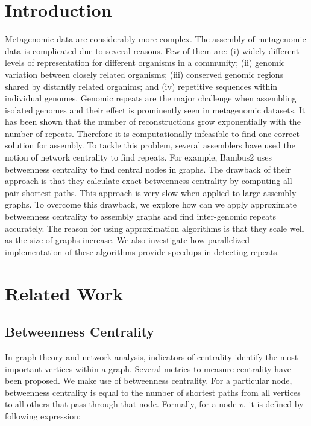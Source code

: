 \documentclass[runningheads,a4paper]{llncs}
\begin{document}
\section{Introduction}

Metagenomic data are considerably more complex. The assembly of metagenomic data is complicated due to several reasons. Few of them are: (i) widely different levels of representation for different organisms in a community; (ii) genomic variation between closely related organisms; (iii) conserved genomic regions shared by distantly related organims; and (iv) repetitive sequences within individual genomes. Genomic repeats are the major challenge when assembling isolated genomes and their effect is prominently seen in metagenomic datasets. It has been shown that the number of reconstructions grow exponentially with the number of repeats\cite{kingsford}. Therefore it is computationally infeasible to find one correct solution for assembly.  To tackle this problem, several assemblers have used the notion of network centrality to find repeats. For example, Bambus2\cite{bambus} uses betweenness centrality to find central nodes in graphs. The drawback of their approach is that they calculate exact betweenness centrality by computing all pair shortest paths. This approach is very slow when applied to large assembly graphs. To overcome this drawback, we explore how can we apply approximate betweenness centrality to assembly graphs and find inter-genomic repeats accurately. The reason for using approximation algorithms is that they scale well as the size of graphs increase. We also investigate how parallelized implementation of these algorithms provide speedups in detecting repeats. 

\section{Related Work}

\subsection*{Betweenness Centrality}
In graph theory and network analysis, indicators of centrality identify the most important vertices within a graph. Several metrics to measure centrality have been proposed. We make use of betweenness centrality. For a particular node, betweenness centrality is equal to the number of shortest paths from all vertices to all others that pass through that node. Formally, for a node $v$, it is defined by following expression:
\end{document}
